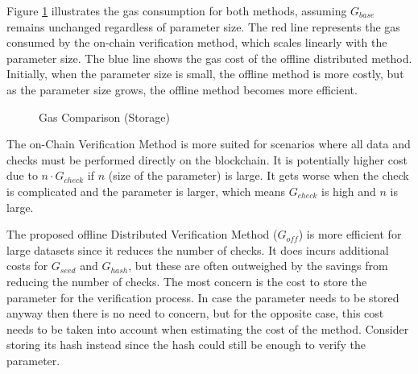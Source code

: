 \documentclass[runningheads]{llncs}
\begin{document}
Figure \ref{fig:gas_compare} illustrates the gas consumption for both methods, assuming \( G_{base} \) remains unchanged regardless of parameter size. The red line represents the gas consumed by the on-chain verification method, which scales linearly with the parameter size. The blue line shows the gas cost of the offline distributed method. Initially, when the parameter size is small, the offline method is more costly, but as the parameter size grows, the offline method becomes more efficient.
\begin{figure}
  \centering
  \caption{Gas Comparison (Storage)}
  \label{fig:gas_compare}
\end{figure}
The on-Chain Verification Method is more suited for scenarios where all data and checks must be performed directly on the blockchain. It is potentially higher cost due to \( n \cdot G_{check} \) if \( n \) (size of the parameter) is large. It gets worse when the check is complicated and the parameter is larger, which means \( G_{check} \) is high and \( n \) is large.
    
The proposed offline Distributed Verification Method (\( G_{off} \)) is more efficient for large datasets since it reduces the number of checks. It does incurs additional costs for \( G_{seed} \) and \( G_{hash} \), but these are often outweighed by the savings from reducing the number of checks. The most concern is the cost to store the parameter for the verification process. In case the parameter needs to be stored anyway then there is no need to concern, but for the opposite case, this cost needs to be taken into account when estimating the cost of the method. Consider storing its hash instead since the hash could still be enough to verify the parameter. 
\end{document}
